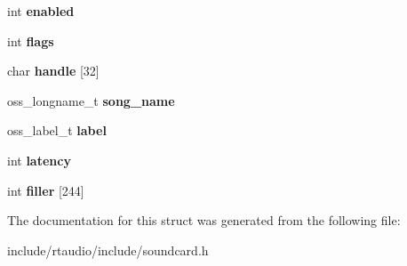 \begin{DoxyCompactItemize}
\item 
int {\bfseries enabled}\hypertarget{structoss__midi__info_ace5b417567c5e92d909d0c0c8509a47b}{}\label{structoss__midi__info_ace5b417567c5e92d909d0c0c8509a47b}

\item 
int {\bfseries flags}\hypertarget{structoss__midi__info_aab484e032d6dc476a4f4f34746709569}{}\label{structoss__midi__info_aab484e032d6dc476a4f4f34746709569}

\item 
char {\bfseries handle} \mbox{[}32\mbox{]}\hypertarget{structoss__midi__info_a4a6040960f9668e1404fbd2eb0b0f28d}{}\label{structoss__midi__info_a4a6040960f9668e1404fbd2eb0b0f28d}

\item 
oss\+\_\+longname\+\_\+t {\bfseries song\+\_\+name}\hypertarget{structoss__midi__info_a32ee98d4416ddca1fb2f5e84fed8da98}{}\label{structoss__midi__info_a32ee98d4416ddca1fb2f5e84fed8da98}

\item 
oss\+\_\+label\+\_\+t {\bfseries label}\hypertarget{structoss__midi__info_afa68775e7928f1b5cb09906012f4126b}{}\label{structoss__midi__info_afa68775e7928f1b5cb09906012f4126b}

\item 
int {\bfseries latency}\hypertarget{structoss__midi__info_a2523daf7c27d703d23d38127e8c23b82}{}\label{structoss__midi__info_a2523daf7c27d703d23d38127e8c23b82}

\item 
int {\bfseries filler} \mbox{[}244\mbox{]}\hypertarget{structoss__midi__info_ad089bc72019c91f9cd7fec38dfcc8f78}{}\label{structoss__midi__info_ad089bc72019c91f9cd7fec38dfcc8f78}

\end{DoxyCompactItemize}


The documentation for this struct was generated from the following file\+:\begin{DoxyCompactItemize}
\item 
include/rtaudio/include/soundcard.\+h\end{DoxyCompactItemize}
